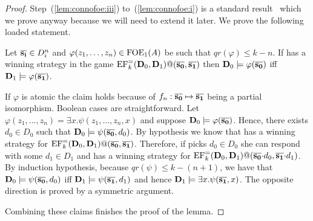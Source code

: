 \begin{proof}
	Step~(\ref{lem:connofoe:iii}) to~(\ref{lem:connofoe:i}) is a standard result~\cite[Corollary 2.2.9]{fmt} which we prove anyway because we will need to extend it later. We prove the following loaded statement.
	\begin{claim}
		Let $\overline{{\mathbf{s_i}}} \in D_i^n$ and $\varphi(z_1,\dots,z_n) \in \mathrm{FOE}_1(A)$ be such that $qr(\varphi) \leq k-n$. If \eloise has a winning strategy in the game $\mathrm{EF}_k^=(\mathbf{D}_0,\mathbf{D}_1)@(\overline{{\mathbf{s_0}}},\overline{{\mathbf{s_1}}})$ then $\mathbf{D}_0 \models \varphi(\overline{{\mathbf{s_0}}})$ iff $\mathbf{D}_1 \models \varphi(\overline{{\mathbf{s_1}}})$.
	\end{claim}
	\begin{pfclaim}
		If $\varphi$ is atomic the claim holds because of $f_n:\overline{{\mathbf{s_0}}}\mapsto \overline{{\mathbf{s_1}}}$ being a partial isomorphism. Boolean cases are straightforward.
		Let $\varphi(z_1,\dots,z_n) = \exists x. \psi(z_1,\dots,z_n,x)$ and suppose $\mathbf{D}_0 \models \varphi(\overline{{\mathbf{s_0}}})$. Hence, there exists $d_0 \in D_0$ such that $\mathbf{D}_0 \models \psi(\overline{{\mathbf{s_0}}},d_0)$.
		By hypothesis we know that \eloise has a winning strategy for $\mathrm{EF}_k^=(\mathbf{D}_0,\mathbf{D}_1)@(\overline{{\mathbf{s_0}}},\overline{{\mathbf{s_1}}})$. Therefore, if \abelard picks $d_0\in D_0$ she can respond with some $d_1\in D_1$ and has a winning strategy for $\mathrm{EF}_{k}^=(\mathbf{D}_0,\mathbf{D}_1)@(\overline{{\mathbf{s_0}}}{\cdot}d_0,\overline{{\mathbf{s_1}}}{\cdot}d_1)$.
		By induction hypothesis, because $qr(\psi) \leq k- (n+1)$, we have that $\mathbf{D}_0 \models \psi(\overline{{\mathbf{s_0}}},d_0)$ iff $\mathbf{D}_1 \models \psi(\overline{{\mathbf{s_1}}},d_1)$ and hence $\mathbf{D}_1 \models \exists x.\psi(\overline{{\mathbf{s_1}}},x)$. The opposite direction is proved by a symmetric argument. %
		\end{pfclaim}
		Combining these claims finishes the proof of the lemma.
\end{proof}


